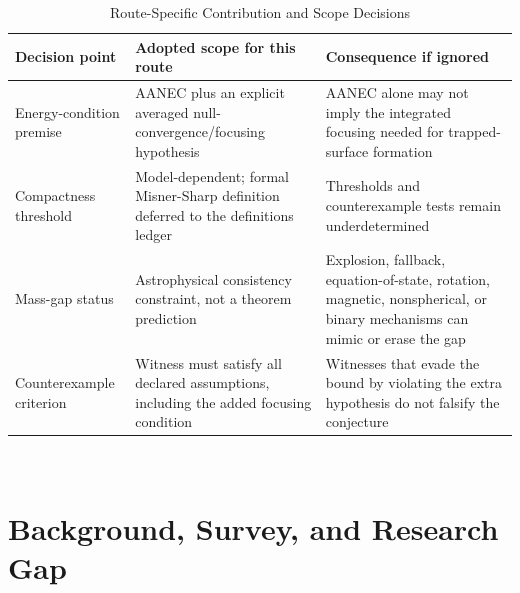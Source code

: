 \documentclass[conference]{IEEEtran}
\begin{document}
\begin{table}[htbp]
\centering
\footnotesize
\setlength{\tabcolsep}{3pt}
\renewcommand{\arraystretch}{1.12}
\caption{Route-Specific Contribution and Scope Decisions}
\label{tab:introduction-introduction-004}
\begin{tabular}{|p{}|p{}|p{}|}
\hline
Decision point & Adopted scope for this route & Consequence if ignored \\\hline
Energy-condition premise & AANEC plus an explicit averaged null-convergence/focusing hypothesis & AANEC alone may not imply the integrated focusing needed for trapped-surface formation \\\hline
Compactness threshold & Model-dependent; formal Misner-Sharp definition deferred to the definitions ledger & Thresholds and counterexample tests remain underdetermined \\\hline
Mass-gap status & Astrophysical consistency constraint, not a theorem prediction & Explosion, fallback, equation-of-state, rotation, magnetic, nonspherical, or binary mechanisms can mimic or erase the gap \\\hline
Counterexample criterion & Witness must satisfy all declared assumptions, including the added focusing condition & Witnesses that evade the bound by violating the extra hypothesis do not falsify the conjecture \\\hline
\end{tabular}
\end{table}~\cite{cite_72d7ff391b29c495,cite_c369df652181e8f7,cite_7a407c865faafd11,cite_fd0f77b2a173c0ab,cite_977568cf7b8a55bf,cite_07d6df5d6978a1fc,cite_f634820e22d7a238,cite_cbbced417410bc6c,cite_42e341ff6471ce89,cite_7a44e6730c44cb39}

\section{Background, Survey, and Research Gap}
\end{document}

